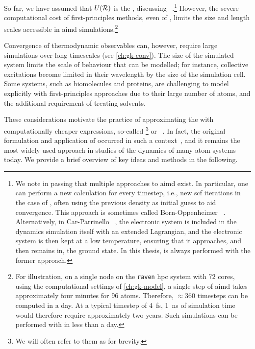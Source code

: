 So far, we have assumed that $U(\mathcal{R})$ is the \bo \pes, discussing ~\cite{imt2005p}.\footnote[][-5\baselineskip]{We note in passing that multiple approaches to \gls{aimd} exist. In particular, one can perform a new calculation for every timestep, i.e., new \gls{scf} iterations in the case of \dft, often using the previous density as initial guess to aid convergence. This approach is sometimes called Born-Oppenheimer \md~\cite{imt2005p}. Alternatively, in Car-Parrinello \md~\cite{cp1985p}, the electronic system is included in the dynamics simulation itself with an extended Lagrangian, and the electronic system is then kept at a low temperature, ensuring that it approaches, and then remains in, the ground state. In this thesis, \aimd is always performed with the former approach.} However, the severe computational cost of first-principles methods, even of \dft, limits the size and length scales accessible in \gls{aimd} simulations.\footnote{For illustration, on a single node on the \texttt{raven} \gls{hpc} system with $72$ cores, using the computational settings of \cref{ch:gk-model}, a single step of \gls{aimd} takes approximately four minutes for $96$ atoms. Therefore, $\approx 360$ timesteps can be computed in a day. At a typical timestep of \qty{4}{fs}, \qty{1}{ns} of simulation time would therefore require approximately two years. Such simulations can be performed with \ffs in less than a day.}

Convergence of thermodynamic observables can, however, require large simulations over long timescales (see \cref{ch:gk-conv}). The size of the simulated system limits the scale of behaviour that can be modelled; for instance, collective excitations become limited in their wavelength by the size of the simulation cell. Some systems, such as biomolecules and proteins, are challenging to model explicitly with first-principles approaches due to their large number of atoms, and the additional requirement of treating solvents.

These considerations motivate the practice of approximating the \bo \pes with computationally cheaper expressions, so-called \footnote{We will often refer to them as  for brevity.} or \ffs~\cite{g2011p}. In fact, the original formulation and application of \md occurred in such a context~\cite{aw1957p,aw1959p,v1967p}, and it remains the most widely used approach in studies of the dynamics of many-atom systems today. We provide a brief overview of key ideas and methods in the following.

